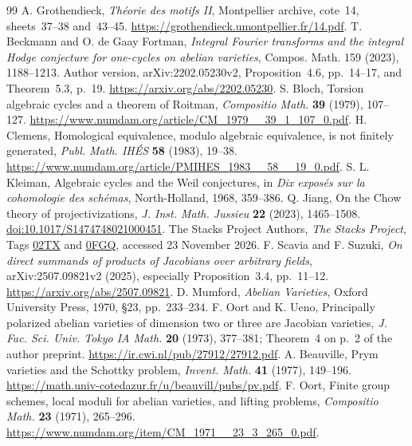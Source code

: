 \documentclass[11pt]{article}
\theoremstyle{definition}
\theoremstyle{remark}
\begin{document}
\begin{thebibliography}{99}
 A. Grothendieck, \emph{Th\'eorie des motifs II}, Montpellier archive, cote~14, sheets~37--38 and~43--45. \url{https://grothendieck.umontpellier.fr/14.pdf}.
 T. Beckmann and O. de Gaay Fortman, \emph{Integral Fourier transforms and the integral Hodge conjecture for one-cycles on abelian varieties}, Compos. Math. 159 (2023), 1188--1213. Author version, arXiv:2202.05230v2, Proposition~4.6, pp.~14--17, and Theorem~5.3, p.~19. \url{https://arxiv.org/abs/2202.05230}.
 S. Bloch, Torsion algebraic cycles and a theorem of Roitman, \emph{Compositio Math.} \textbf{39} (1979), 107--127. \url{https://www.numdam.org/article/CM_1979__39_1_107_0.pdf}.
 H. Clemens, Homological equivalence, modulo algebraic equivalence, is not finitely generated, \emph{Publ. Math. IH\'ES} \textbf{58} (1983), 19--38. \url{https://www.numdam.org/article/PMIHES_1983__58__19_0.pdf}.
 S. L. Kleiman, Algebraic cycles and the Weil conjectures, in \emph{Dix expos\'es sur la cohomologie des sch\'emas}, North-Holland, 1968, 359--386.
 Q. Jiang, On the Chow theory of projectivizations, \emph{J. Inst. Math. Jussieu} \textbf{22} (2023), 1465--1508. \href{https://doi.org/10.1017/S1474748021000451}{doi:10.1017/S1474748021000451}.
 The Stacks Project Authors, \emph{The Stacks Project}, Tags \href{https://stacks.math.columbia.edu/tag/02TX}{02TX} and \href{https://stacks.math.columbia.edu/tag/0FGQ}{0FGQ}, accessed 23 November 2026.
 F. Scavia and F. Suzuki, \emph{On direct summands of products of Jacobians over arbitrary fields}, arXiv:2507.09821v2 (2025), especially Proposition~3.4, pp.~11--12. \url{https://arxiv.org/abs/2507.09821}.
 D. Mumford, \emph{Abelian Varieties}, Oxford University Press, 1970, \S23, pp.~233--234.
 F. Oort and K. Ueno, Principally polarized abelian varieties of dimension two or three are Jacobian varieties, \emph{J. Fac. Sci. Univ. Tokyo IA Math.} \textbf{20} (1973), 377--381; Theorem~4 on p.~2 of the author preprint. \url{https://ir.cwi.nl/pub/27912/27912.pdf}.
 A. Beauville, Prym varieties and the Schottky problem, \emph{Invent. Math.} \textbf{41} (1977), 149--196. \url{https://math.univ-cotedazur.fr/u/beauvill/pubs/pv.pdf}.
 F. Oort, Finite group schemes, local moduli for abelian varieties, and lifting problems, \emph{Compositio Math.} \textbf{23} (1971), 265--296. \url{https://www.numdam.org/item/CM_1971__23_3_265_0.pdf}.

\end{thebibliography}
\end{document}
